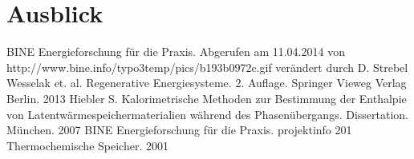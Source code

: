 \documentclass[11pt,a4paper]{scrartcl}
\begin{document}
\section{Ausblick}

\listoftables
\newpage
\listoffigures
\newpage
\begin{thebibliography}{99}
	BINE Energieforschung für die Praxis. Abgerufen am 11.04.2014
	von http://www.bine.info/typo3temp/pics/b193b0972c.gif verändert durch D. Strebel
	Wesselak et. al. Regenerative Energiesysteme. 2. Auflage.
	Springer Vieweg Verlag Berlin. 2013
	 Hiebler S. Kalorimetrische Methoden zur Bestimmung der
	Enthalpie von Latentwärmespeichermaterialien während des Phasenübergangs. Dissertation.
	München. 2007
	 BINE Energieforschung für die Praxis. projektinfo 2\/01
	Thermochemische Speicher. 2001
\end{thebibliography}
\end{document}
